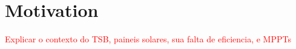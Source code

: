 \section{Motivation}
\label{sec:introduction:motivation}

\textcolor{red}{Explicar o contexto do TSB, paineis solares, sua falta de eficiencia, e MPPTs}




